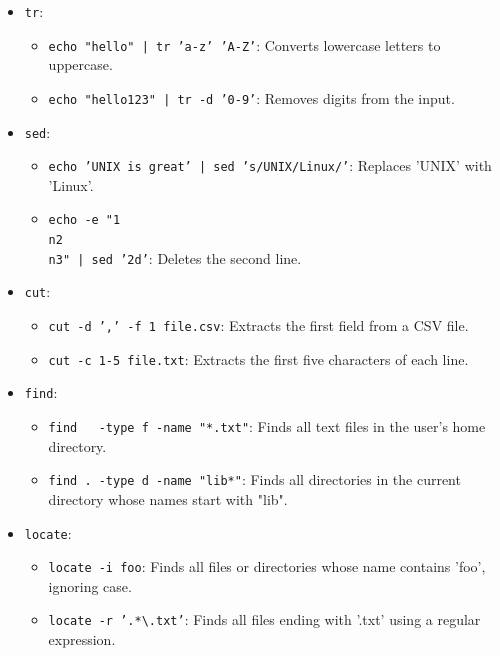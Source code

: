 \begin{exampleblock}
    
    \begin{itemize}
        \item \texttt{tr}:
        \begin{itemize}
            \item \texttt{\scriptsize{echo "hello" | tr 'a-z' 'A-Z'}}: Converts lowercase letters to uppercase.
            \item \texttt{\scriptsize{echo "hello123" | tr -d '0-9'}}: Removes digits from the input.
        \end{itemize}
        \item \texttt{sed}:
        \begin{itemize}
            \item \texttt{\scriptsize{echo 'UNIX is great' | sed 's/UNIX/Linux/'}}: Replaces 'UNIX' with 'Linux'.
            \item \texttt{\scriptsize{echo -e "1\\n2\\n3" | sed '2d'}}: Deletes the second line.
        \end{itemize}
        \item \texttt{cut}:
        \begin{itemize}
            \item \texttt{\scriptsize{cut -d ',' -f 1 file.csv}}: Extracts the first field from a CSV file.
            \item \texttt{\scriptsize{cut -c 1-5 file.txt}}: Extracts the first five characters of each line.
        \end{itemize}
        \item \texttt{find}:
        \begin{itemize}
            \item \texttt{\scriptsize{find ~ -type f -name "*.txt"}}: Finds all text files in the user's home directory.
            \item \texttt{\scriptsize{find . -type d -name "lib*"}}: Finds all directories in the current directory whose names start with "lib".
        \end{itemize}
        \item \texttt{locate}:
        \begin{itemize}
            \item \texttt{\scriptsize{locate -i foo}}: Finds all files or directories whose name contains 'foo', ignoring case.
            \item \texttt{\scriptsize{locate -r '.*\textbackslash{}.txt'}}: Finds all files ending with '.txt' using a regular expression.
        \end{itemize}
    \end{itemize}
    
\end{exampleblock}
    

